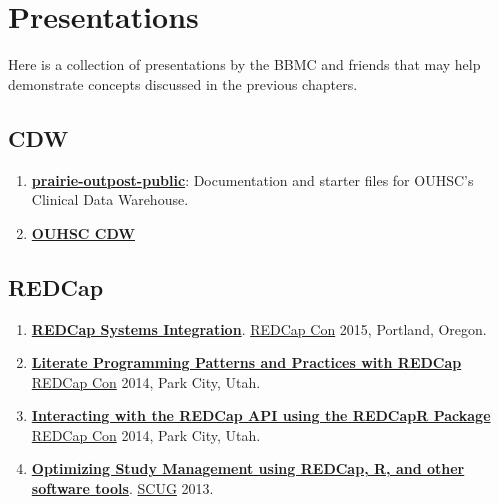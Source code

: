 \documentclass[
]{book}
\providecommand{\tightlist}{%
  \setlength{\itemsep}{0pt}\setlength{\parskip}{0pt}}
\begin{document}
\hypertarget{presentations}{%
\chapter{Presentations}\label{presentations}}

Here is a collection of presentations by the BBMC and friends that may help demonstrate concepts discussed in the previous chapters.

\hypertarget{cdw}{%
\section{CDW}\label{cdw}}

\begin{enumerate}
\def\labelenumi{\arabic{enumi}.}
\tightlist
\item
  \textbf{\href{https://github.com/OuhscBbmc/prairie-outpost-public}{prairie-outpost-public}}: Documentation and starter files for OUHSC's Clinical Data Warehouse.
\item
  \textbf{\href{https://github.com/OuhscBbmc/BbmcResources/blob/master/Publications/presentation-2015-11-18-cdw-bse/clinical-data-warehouse-bse.pdf}{OUHSC CDW}}
\end{enumerate}

\hypertarget{redcap}{%
\section{REDCap}\label{redcap}}

\begin{enumerate}
\def\labelenumi{\arabic{enumi}.}
\tightlist
\item
  \textbf{\href{https://github.com/OuhscBbmc/BbmcResources/blob/master/Publications/Presentation2015-09-REDCapCon/REDCapIntegration.pdf}{REDCap Systems Integration}}. \href{https://projectredcap.org/about/redcapcon/}{REDCap Con} 2015, Portland, Oregon.
\item
  \textbf{\href{https://github.com/OuhscBbmc/RedcapExamplesAndPatterns/blob/master/Publications/Presentation-2014-09-REDCapCon/LiterateProgrammingPatternsAndPracticesWithREDCap.pptx}{Literate Programming Patterns and Practices with REDCap}} \href{https://projectredcap.org/about/redcapcon/}{REDCap Con} 2014, Park City, Utah.
\item
  \textbf{\href{https://github.com/OuhscBbmc/RedcapExamplesAndPatterns/blob/master/Publications/Presentation-2014-09-REDCapCon/REDCapR.pptx}{Interacting with the REDCap API using the REDCapR Package}} \href{https://projectredcap.org/about/redcapcon/}{REDCap Con} 2014, Park City, Utah.
\item
  \textbf{\href{https://github.com/OuhscBbmc/StatisticalComputing/blob/master/2013_Presentations/03_March/RedcapForUserGroup.pptx}{Optimizing Study Management using REDCap, R, and other software tools}}. \href{https://github.com/OuhscBbmc/StatisticalComputing}{SCUG} 2013.
\end{enumerate}
\end{document}
